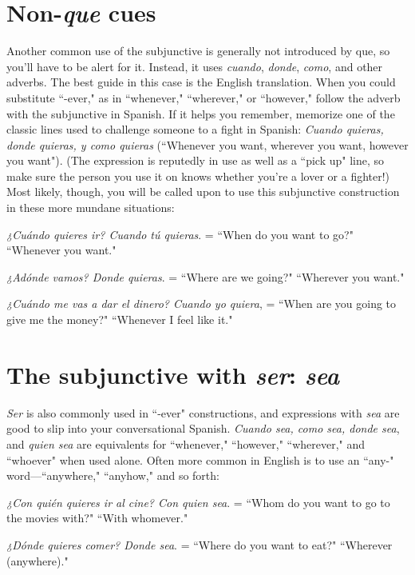\section{Non-\emph{que} cues}

Another common use of the subjunctive is generally not introduced by que, so you'll have to be alert for it. Instead, it uses \emph{cuando},
\emph{donde}, \emph{como}, and other adverbs.
The best guide in this case is the English translation.
When you could substitute ``-ever," as in ``whenever," ``wherever,"
or ``however," follow the adverb with the subjunctive
in Spanish. If it helps you remember, memorize one of the classic
lines used to challenge someone to a fight in Spanish: \emph{Cuando quieras,
donde quieras, y como quieras} (``Whenever you want, wherever you
want, however you want"). (The expression is reputedly in use as well
as a ``pick up" line, so make sure the person you use it on knows
whether you're a lover or a fighter!) Most likely, though, you will be
called upon to use this subjunctive construction in these more mundane situations:

\bsk

\indu \emph{¿Cuándo quieres ir? Cuando tú quieras}. = ``When do you
want to go?" ``Whenever you want."

\indu \emph{¿Adónde vamos? Donde quieras}. = ``Where are we going?"
``Wherever you want."

\indu \emph{¿Cuándo me vas a dar el dinero? Cuando yo quiera}, = ``When
are you going to give me the money?" ``Whenever I
feel like it."

\section{The subjunctive with \emph{ser}: \emph{sea}}

\emph{Ser} is also commonly used in ``-ever" constructions, and expressions with \emph{sea} are good to slip into your conversational Spanish.
\emph{Cuando sea, como sea, donde sea}, and \emph{quien sea} are equivalents for
``whenever," ``however," ``wherever," and ``whoever" when used alone.
Often more common in English is to use an ``any-" word---``anywhere," ``anyhow," and so forth:

\bsk

\indu \emph{¿Con quién quieres ir al cine? Con quien sea}. = ``Whom
do you want to go to the movies with?" ``With
whomever."

\indu \emph{¿Dónde quieres comer? Donde sea}. = ``Where do you want to
eat?" ``Wherever (anywhere)."

